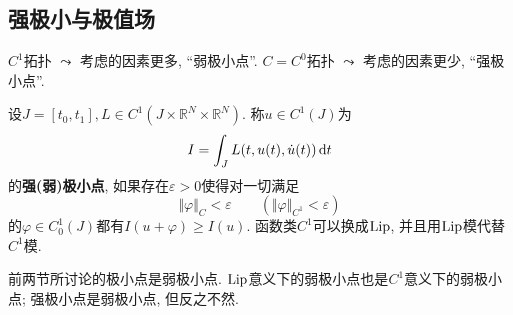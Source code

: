 \subsection{强极小与极值场}

$C^1$拓扑 $\leadsto$ 考虑的因素更多, ``弱极小点''. $C = C^0$拓扑 $\leadsto$ 考虑的因素更少, ``强极小点''.

\begin{definition}
    设$J = [t_0, t_1], L \in C^1(J \times \mathbb{R}^N \times \mathbb{R}^N)$. 称$u \in C^1(J)$为 
    \begin{equation*}
        I = \int_JL(t, u(t), \dot u(t)) \,{\rm d}t
    \end{equation*}
    的\textbf{强(弱)极小点}, 如果存在$\varepsilon > 0$使得对一切满足
    \begin{equation*}
        \Vert \varphi \Vert_C < \varepsilon \qquad (\Vert \varphi \Vert_{C^1} < \varepsilon) 
    \end{equation*}
    的$\varphi \in C_0^1(J)$都有$I(u + \varphi) \geq I(u)$. 函数类$C^1$可以换成${\rm Lip}$, 并且用${\rm Lip}$模代替$C^1$模.
\end{definition}

前两节所讨论的极小点是弱极小点. ${\rm Lip}$意义下的弱极小点也是$C^1$意义下的弱极小点; 强极小点是弱极小点, 但反之不然.

